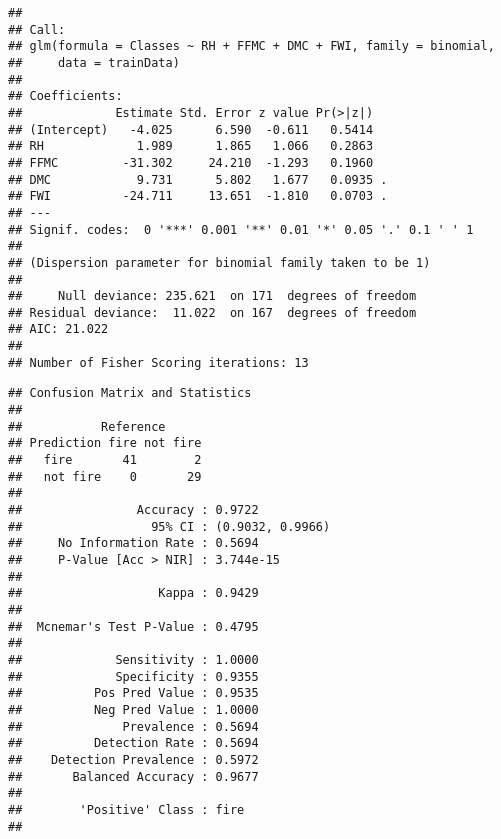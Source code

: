 \documentclass[
]{article}
\newenvironment{Shaded}{\begin{snugshade}}{\end{snugshade}}
\newcommand{\AttributeTok}[1]{\textcolor[rgb]{0.13,0.29,0.53}{#1}}
\newcommand{\CommentTok}[1]{\textcolor[rgb]{0.56,0.35,0.01}{\textit{#1}}}
\newcommand{\DecValTok}[1]{\textcolor[rgb]{0.00,0.00,0.81}{#1}}
\newcommand{\FunctionTok}[1]{\textcolor[rgb]{0.13,0.29,0.53}{\textbf{#1}}}
\newcommand{\NormalTok}[1]{#1}
\newcommand{\OtherTok}[1]{\textcolor[rgb]{0.56,0.35,0.01}{#1}}
\newcommand{\SpecialCharTok}[1]{\textcolor[rgb]{0.81,0.36,0.00}{\textbf{#1}}}
\newcommand{\StringTok}[1]{\textcolor[rgb]{0.31,0.60,0.02}{#1}}
\begin{document}
\begin{verbatim}
## 
## Call:
## glm(formula = Classes ~ RH + FFMC + DMC + FWI, family = binomial, 
##     data = trainData)
## 
## Coefficients:
##             Estimate Std. Error z value Pr(>|z|)  
## (Intercept)   -4.025      6.590  -0.611   0.5414  
## RH             1.989      1.865   1.066   0.2863  
## FFMC         -31.302     24.210  -1.293   0.1960  
## DMC            9.731      5.802   1.677   0.0935 .
## FWI          -24.711     13.651  -1.810   0.0703 .
## ---
## Signif. codes:  0 '***' 0.001 '**' 0.01 '*' 0.05 '.' 0.1 ' ' 1
## 
## (Dispersion parameter for binomial family taken to be 1)
## 
##     Null deviance: 235.621  on 171  degrees of freedom
## Residual deviance:  11.022  on 167  degrees of freedom
## AIC: 21.022
## 
## Number of Fisher Scoring iterations: 13
\end{verbatim}

\begin{Shaded}
\end{Shaded}

\begin{verbatim}
## Confusion Matrix and Statistics
## 
##           Reference
## Prediction fire not fire
##   fire       41        2
##   not fire    0       29
##                                           
##                Accuracy : 0.9722          
##                  95% CI : (0.9032, 0.9966)
##     No Information Rate : 0.5694          
##     P-Value [Acc > NIR] : 3.744e-15       
##                                           
##                   Kappa : 0.9429          
##                                           
##  Mcnemar's Test P-Value : 0.4795          
##                                           
##             Sensitivity : 1.0000          
##             Specificity : 0.9355          
##          Pos Pred Value : 0.9535          
##          Neg Pred Value : 1.0000          
##              Prevalence : 0.5694          
##          Detection Rate : 0.5694          
##    Detection Prevalence : 0.5972          
##       Balanced Accuracy : 0.9677          
##                                           
##        'Positive' Class : fire            
## 
\end{verbatim}
\end{document}

